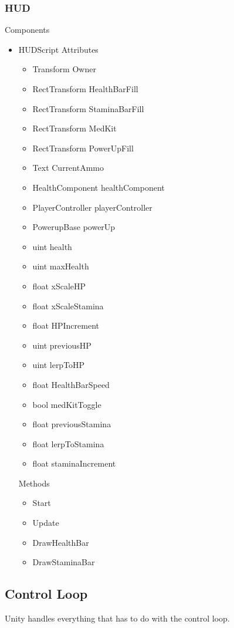 \documentclass[11pt]{article}
\begin{document}
\subsubsection{HUD}
Components
\begin{itemize}
\item HUDScript
\newline Attributes
\begin{itemize}
\item Transform Owner
\item RectTransform HealthBarFill
\item RectTransform StaminaBarFill
\item RectTransform MedKit
\item RectTransform PowerUpFill
\item Text CurrentAmmo
\item HealthComponent healthComponent
\item PlayerController playerController
\item PowerupBase powerUp
\item uint health
\item uint maxHealth
\item float xScaleHP
\item float xScaleStamina
\item float HPIncrement
\item uint previousHP
\item uint lerpToHP
\item float HealthBarSpeed
\item bool medKitToggle
\item float previousStamina
\item float lerpToStamina
\item float staminaIncrement
\end{itemize}
Methods
\begin{itemize}
\item Start
\item Update
\item DrawHealthBar
\item DrawStaminaBar
\end{itemize}
\end{itemize}

\subsection{Control Loop}
Unity handles everything that has to do with the control loop.
\end{document}
